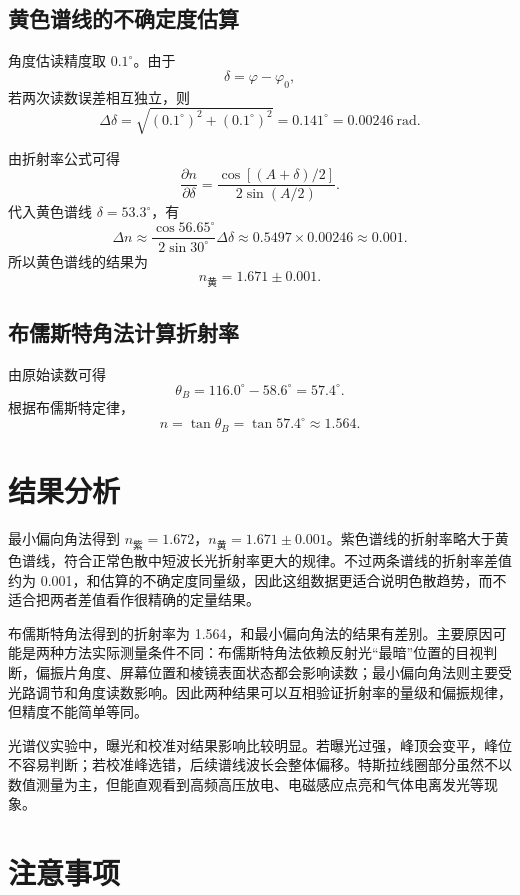 \documentclass[UTF8,12pt,a4paper]{ctexart}
\begin{document}
\subsection{黄色谱线的不确定度估算}

角度估读精度取 \(0.1^\circ\)。由于
\[
    \delta=\varphi-\varphi_0,
\]
若两次读数误差相互独立，则
\[
    \Delta\delta=\sqrt{(0.1^\circ)^2+(0.1^\circ)^2}
    =0.141^\circ
    =0.00246\ \text{rad}.
\]

由折射率公式可得
\[
    \frac{\partial n}{\partial \delta}
    =\frac{\cos[(A+\delta)/2]}{2\sin(A/2)} .
\]
代入黄色谱线 \(\delta=53.3^\circ\)，有
\[
    \Delta n
    \approx
    \frac{\cos56.65^\circ}{2\sin30^\circ}\Delta\delta
    \approx 0.5497\times0.00246
    \approx 0.001 .
\]
所以黄色谱线的结果为
\[
    n_{\text{黄}}=1.671\pm0.001 .
\]

\subsection{布儒斯特角法计算折射率}

由原始读数可得
\[
    \theta_B=116.0^\circ-58.6^\circ=57.4^\circ .
\]
根据布儒斯特定律，
\[
    n=\tan\theta_B=\tan57.4^\circ\approx1.564 .
\]

\section{结果分析}

最小偏向角法得到 \(n_{\text{紫}}=1.672\)，\(n_{\text{黄}}=1.671\pm0.001\)。紫色谱线的折射率略大于黄色谱线，符合正常色散中短波长光折射率更大的规律。不过两条谱线的折射率差值约为 0.001，和估算的不确定度同量级，因此这组数据更适合说明色散趋势，而不适合把两者差值看作很精确的定量结果。

布儒斯特角法得到的折射率为 1.564，和最小偏向角法的结果有差别。主要原因可能是两种方法实际测量条件不同：布儒斯特角法依赖反射光“最暗”位置的目视判断，偏振片角度、屏幕位置和棱镜表面状态都会影响读数；最小偏向角法则主要受光路调节和角度读数影响。因此两种结果可以互相验证折射率的量级和偏振规律，但精度不能简单等同。

光谱仪实验中，曝光和校准对结果影响比较明显。若曝光过强，峰顶会变平，峰位不容易判断；若校准峰选错，后续谱线波长会整体偏移。特斯拉线圈部分虽然不以数值测量为主，但能直观看到高频高压放电、电磁感应点亮和气体电离发光等现象。

\section{注意事项}
\end{document}
